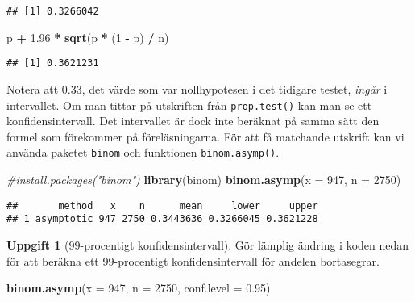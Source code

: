 \documentclass[
]{book}
\newenvironment{Shaded}{\begin{snugshade}}{\end{snugshade}}
\newcommand{\AttributeTok}[1]{\textcolor[rgb]{0.13,0.29,0.53}{#1}}
\newcommand{\CommentTok}[1]{\textcolor[rgb]{0.56,0.35,0.01}{\textit{#1}}}
\newcommand{\DecValTok}[1]{\textcolor[rgb]{0.00,0.00,0.81}{#1}}
\newcommand{\FloatTok}[1]{\textcolor[rgb]{0.00,0.00,0.81}{#1}}
\newcommand{\FunctionTok}[1]{\textcolor[rgb]{0.13,0.29,0.53}{\textbf{#1}}}
\newcommand{\NormalTok}[1]{#1}
\newcommand{\SpecialCharTok}[1]{\textcolor[rgb]{0.81,0.36,0.00}{\textbf{#1}}}
\theoremstyle{definition}
\theoremstyle{definition}
\theoremstyle{definition}
\newtheorem{exercise}{Uppgift}[chapter]
\theoremstyle{definition}
\theoremstyle{remark}
\begin{document}
\begin{verbatim}
## [1] 0.3266042
\end{verbatim}

\begin{Shaded}
\begin{Highlighting}[]
\NormalTok{p }\SpecialCharTok{+} \FloatTok{1.96} \SpecialCharTok{*} \FunctionTok{sqrt}\NormalTok{(p }\SpecialCharTok{*}\NormalTok{ (}\DecValTok{1} \SpecialCharTok{{-}}\NormalTok{ p) }\SpecialCharTok{/}\NormalTok{ n)}
\end{Highlighting}
\end{Shaded}

\begin{verbatim}
## [1] 0.3621231
\end{verbatim}

Notera att 0.33, det värde som var nollhypotesen i det tidigare testet, \emph{ingår} i intervallet. Om man tittar på utskriften från \texttt{prop.test()} kan man se ett konfidensintervall. Det intervallet är dock inte beräknat på samma sätt den formel som förekommer på föreläsningarna. För att få matchande utskrift kan vi använda paketet \texttt{binom} och funktionen \texttt{binom.asymp()}.

\begin{Shaded}
\begin{Highlighting}[]
\CommentTok{\#install.packages("binom")}
\FunctionTok{library}\NormalTok{(binom)}
\FunctionTok{binom.asymp}\NormalTok{(}\AttributeTok{x =} \DecValTok{947}\NormalTok{, }\AttributeTok{n =} \DecValTok{2750}\NormalTok{)}
\end{Highlighting}
\end{Shaded}

\begin{verbatim}
##       method   x    n      mean     lower     upper
## 1 asymptotic 947 2750 0.3443636 0.3266045 0.3621228
\end{verbatim}

\begin{exercise}[99-procentigt konfidensintervall]

Gör lämplig ändring i koden nedan för att beräkna ett 99-procentigt konfidensintervall för andelen bortasegrar.

\begin{Shaded}
\begin{Highlighting}[]
\FunctionTok{binom.asymp}\NormalTok{(}\AttributeTok{x =} \DecValTok{947}\NormalTok{, }\AttributeTok{n =} \DecValTok{2750}\NormalTok{, }\AttributeTok{conf.level =} \FloatTok{0.95}\NormalTok{)}
\end{Highlighting}
\end{Shaded}

\end{exercise}
\end{document}

